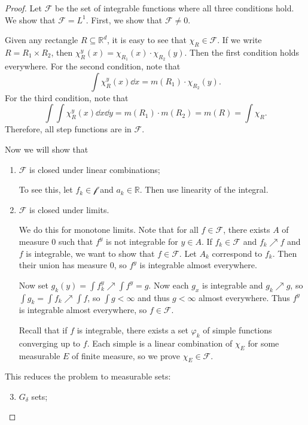 \documentclass[leqno, openany]{memoir}
\theoremstyle{definition}
\theoremstyle{remark}
\theoremstyle{plain}
\theoremstyle{definition}
\theoremstyle{remark}
\newcommand{\R}{\mathbb{R}}
\newcommand{\mc}[1]{\mathcal{#1}}
\begin{document}
\begin{proof} Let $\mc{F}$ be the set of integrable functions where all three
    conditions hold. We show that $\mc{F} = L^1$. First, we show that $\mc{F}
    \neq 0$.

    Given any rectangle $R \subseteq \R^d$, it is easy to see that $\chi_R \in
    \mc{F}$. If we write $R = R_1 \times R_2$, then $\chi_R^y(x) =
    \chi_{R_1}(x) \cdot \chi_{R_2}(y)$. Then the first condition holds
    everywhere. For the second condition, note that \[ \int \chi_R^y(x) \dd{x}
    = m(R_1) \cdot \chi_{R_2}(y). \] For the third condition, note that \[ \int
\int \chi_R^y(x) \dd{x} \dd{y} = m(R_1) \cdot m(R_2) = m(R) = \int \chi_R. \]
Therefore, all step functions are in $\mc{F}$.

    Now we will show that \begin{enumerate} \item $\mc{F}$ is closed under
        linear combinations;

            To see this, let $f_k \in \mc{f}$ and $a_k \in \R$. Then use
            linearity of the integral.  \item $\mc{F}$ is closed under limits.

            We do this for monotone limits. Note that for all $f \in \mc{F}$,
            there exists $A$ of measure $0$ such that $f^y$ is not integrable
            for $y \in A$. If $f_k \in \mc{F}$ and $f_k \nearrow f$ and $f$ is
            integrable, we want to show that $f \in \mc{F}$. Let $A_k$
            correspond to $f_k$. Then their union has measure $0$, so $f^y$ is
            integrable almost everywhere. 

            Now set $g_k(y) = \int f_k^y \nearrow \int f^y = g$. Now each $g_x$
            is integrable and $g_k \nearrow g$, so $\int g_k = \int f_k
            \nearrow \int f$, so $\int g < \infty$ and thus $g < \infty$ almost
            everywhere. Thus $f^y$ is integrable almost everywhere, so $f \in
            \mc{F}$.

            Recall that if $f$ is integrable, there exists a set $\varphi_k$ of
    simple functions converging up to $f$. Each simple is a linear combination
    of $\chi_E$ for some measurable $E$ of finite measure, so we prove $\chi_E
    \in \mc{F}$.  \end{enumerate} This reduces the problem to measurable sets:
    \begin{enumerate} \setcounter{enumi}{2} \item $G_{\delta}$ sets;


\end{enumerate}
\end{proof}
\end{document}
